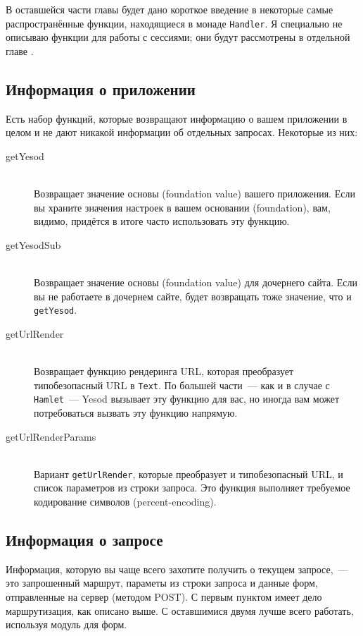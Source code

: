 В оставшейся части главы будет дано короткое введение в некоторые
самые распространённые функции, находящиеся в монаде
\lstinline!Handler!. Я специально не описываю функции для работы с
сессиями; они будут рассмотрены в отдельной главе .

\subsection{Информация о приложении}
Есть набор функций, которые возвращают информацию о вашем приложении в
целом и не дают никакой информации об отдельных запросах. Некоторые из
них:
\begin{description}
\item[getYesod] \hfill \\
Возвращает значение основы (foundation value) вашего приложения. Если вы
храните значения настроек в вашем основании (foundation), вам, видимо,
придётся в итоге часто использовать эту функцию.

\item[getYesodSub] \hfill \\
Возвращает значение основы (foundation value) для дочернего сайта. Если вы
не работаете в дочернем сайте, будет возвращать тоже значение, что и
\lstinline!getYesod!.

\item[getUrlRender] \hfill \\
Возвращает функцию рендеринга URL, которая преобразует типобезопасный
URL в \lstinline!Text!. По большей части~--- как и в случае с
\lstinline!Hamlet!~--- Yesod вызывает эту функцию для вас, но иногда
вам может потребоваться вызвать эту функцию напрямую.

\item[getUrlRenderParams]  \hfill \\
Вариант \lstinline!getUrlRender!, которые преобразует и
типобезопасный URL, и список параметров из строки запроса. Это функция
выполняет требуемое кодирование символов (percent-encoding).
\end{description}

\subsection{Информация о запросе}
Информация, которую вы чаще всего захотите получить о текущем
запросе,~--- это запрошенный маршрут, параметы из строки запроса и
данные форм, отправленные на сервер (методом POST). С первым пунктом имеет
дело маршрутизация, как описано выше. С оставшимися двумя лучше всего
работать, используя модуль для форм.

